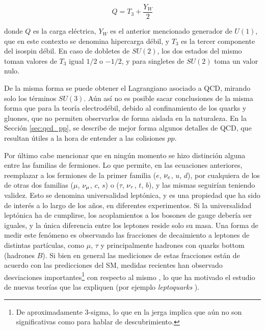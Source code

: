 \begin{equation}
Q = T_3 + \frac{Y_W}{2} 
\end{equation}

\noindent
donde $Q$ es la carga eléctrica, $Y_W$ es el anterior mencionado generador de $U(1)$, que en este contexto se denomina hipercarga débil, y $T_3$ es la tercer componente del isospin débil. En caso de dobletes de $SU(2)$, los dos estados del mismo toman valores de $T_3$ igual $1/2$ o $-1/2$, y para singletes de $SU(2)$ toma un valor nulo.

De la misma forma se puede obtener el Lagrangiano asociado a QCD, mirando solo los términos $SU(3)$. Aún así no es posible sacar conclusiones de la misma forma que para la teoría electrodébil, debido al confinamiento de los quarks y gluones, que no permiten observarlos de forma aislada en la naturaleza. En la Sección \ref{sec:qcd_pp}, se describe de mejor forma algunos detalles de QCD, que resultan útiles a la hora de entender a las colisiones $pp$.

Por último cabe mencionar que en ningún momento se hizo distinción alguna entre las familias de fermiones. Lo que permite, en las ecuaciones anteriores, reemplazar a los fermiones de la primer familia ($e$, $\nu_e$, $u$, $d$), por cualquiera de los de otras dos familias ($\mu$, $\nu_{\mu}$, $c$, $s$) o ($\tau$, $\nu_{\tau}$, $t$, $b$), y las mismas seguirían teniendo validez.
Esto se denomina universalidad leptónica, y es una propiedad que ha sido de interés a lo largo de los años, en diferentes experimentos. Si la universalidad leptónica ha de cumplirse, los acoplamientos a los bosones de gauge debería ser iguales, y la única diferencia entre los leptones reside solo su masa. Una forma de medir este fenómeno es observando las fracciones de decaimiento a leptones de distintas partículas, como $\mu$, $\tau$ y principalmente hadrones con quarks bottom (hadrones $B$). Si bien en general las mediciones de estas fracciones están de acuerdo con las predicciones del SM, medidas recientes han observado desviaciones importantes\footnote{De aproximadamente 3-sigma, lo que en la jerga implica que aún no son significativas como para hablar de descubrimiento.} con respecto al mismo \cite{lepton_uni_1, lepton_uni_2}, lo que ha motivado el estudio de nuevas teorías que las expliquen (por ejemplo \textit{leptoquarks} \cite{leptoquark_1, Okumura:2744026}).


